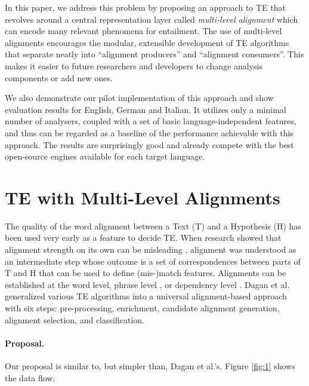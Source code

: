 \documentclass[11pt,letterpaper]{article}
\begin{document}
In this paper, we address this problem by proposing an approach to TE
that revolves around a central representation layer called {\em
  multi-level alignment} which can encode many relevant phenomena for
entailment. The use of multi-level alignments encourages the modular,
extensible development of TE algorithms that separate neatly into
``alignment producers'' and ``alignment consumers''. This makes it
easier to future researchers and developers to change analysis
components or add new ones. 

We also demonstrate our pilot implementation of this approach and
show evaluation results for English, German and Italian. It utilizes
only a minimal number of analysers, coupled with a set of basic
language-independent features, and thus can be regarded as a baseline
of the performance achievable with this approach.  The results are
surprisingly good and already compete with the best open-source
engines available for each target language.

\section{TE with Multi-Level Alignments}

The quality of the word alignment between a Text (T) and a Hypothesis
(H) has been used very early as a feature to decide TE. When research
showed that alignment strength on its own can be misleading
\cite{maccartney-EtAl:2006:HLT-NAACL06-Main}, alignment was 
understood as an intermediate step whose outcome is a set of
correspondences between parts of T and H that can be used to define
(mis-)match features. Alignments can be established at the
word level, phrase level \cite{MacCartney:EMNLP08}, or dependency
level \cite{dinu-wang:2009:EACL}. Dagan et
al.  generalized various TE algorithms into
a universal alignment-based approach with six steps: pre-processing,
enrichment, candidate alignment generation, alignment selection, and
classification. 

\paragraph{Proposal.} Our proposal is similar to, but simpler than,
Dagan et al.'s. Figure \ref{fig:1} shows the data flow.
\end{document}
